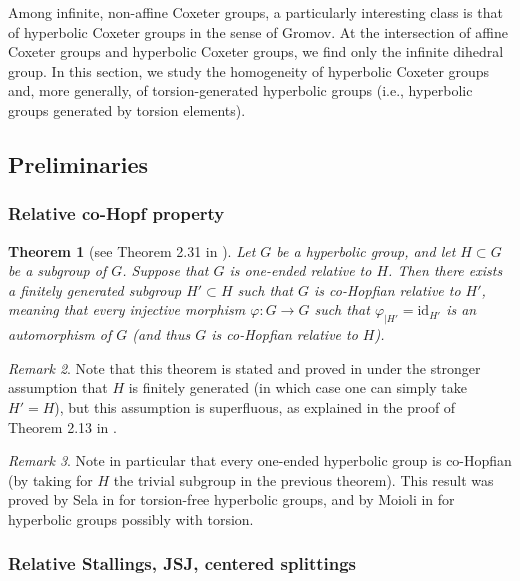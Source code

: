 \documentclass[a4paper, 11pt]{amsart}
\newtheorem{te}{Theorem}[section]
\theoremstyle{definition}
\theoremstyle{remark}
\newtheorem{rk}[te]{Remark}
\begin{document}
Among infinite, non-affine Coxeter groups, a particularly interesting class is that of hyperbolic Coxeter groups in the sense of Gromov. At the intersection of affine Coxeter groups and hyperbolic Coxeter groups, we find only the infinite dihedral group. In this section, we study the homogeneity of hyperbolic Coxeter groups and, more generally, of torsion-generated hyperbolic groups (i.e., hyperbolic groups generated by torsion elements).

\subsection{Preliminaries}

\subsubsection{Relative co-Hopf property}

\begin{te}[see Theorem 2.31 in \cite{And18b}]\label{relative_co_Hopf}
Let $G$ be a hyperbolic group, and let $H\subset G$ be a subgroup of $G$. Suppose that $G$ is one-ended relative to $H$. Then there exists a finitely generated subgroup $H'\subset H$ such that $G$ is co-Hopfian relative to $H'$, meaning that every injective morphism $\varphi : G \rightarrow G$ such that $\varphi_{\vert H'}=\mathrm{id}_{H'}$ is an automorphism of $G$ (and thus $G$ is co-Hopfian relative to $H$).
\end{te}

\begin{rk}
Note that this theorem is stated and proved in \cite{And18b} under the stronger assumption that $H$ is finitely generated (in which case one can simply take $H'=H$), but this assumption is superfluous, as explained in the proof of Theorem 2.13 in \cite{And21b}.
\end{rk}

\begin{rk}
Note in particular that every one-ended hyperbolic group is co-Hopfian (by taking for $H$ the trivial subgroup in the previous theorem). This result was proved by Sela in \cite{Sel97} for torsion-free hyperbolic groups, and by Moioli in \cite{Moi13} for hyperbolic groups possibly with torsion. 
\end{rk}

\subsubsection{Relative Stallings, JSJ, centered splittings}
\end{document}
